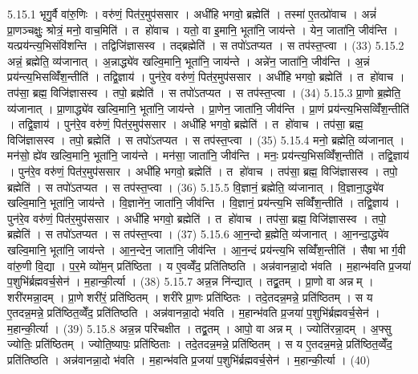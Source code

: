 5.15.1
भृगु॒र्वै वा॑रु॒णिः । वरु॑णं॒ पित॑र॒मुप॑ससार । अधी॑हि भगवो॒ ब्रह्मेति॑ । तस्मा॑ ए॒तत्प्रो॑वाच । अन्नं॑ प्रा॒णञ्चक्षुः॒ श्रोत्रं॒ मनो॒ वाच॒मिति॑ । त हो॑वाच । यतो॒ वा इ॒मानि॒ भूता॑नि॒ जाय॑न्ते । येन॒ जाता॑नि॒ जीव॑न्ति । यत्प्रय॑न्त्य॒भिसंवि॑शन्ति । तद्विजि॑ज्ञासस्व । तद्ब्रह्मेति॑ । स तपो॑ऽतप्यत । स तप॑स्त॒प्त्वा । (33)
5.15.2
अन्नं॒ ब्रह्मेति॒ व्य॑जानात् । अ॒न्नाद्ध्ये॑व खल्वि॒मानि॒ भूता॑नि॒ जाय॑न्ते । अन्ने॑न॒ जाता॑नि॒ जीव॑न्ति । अ॒न्नं प्रय॑न्त्य॒भिसव्विँ॑श॒न्तीति॑ । तद्वि॒ज्ञाय॑ । पुन॑रे॒व वरु॑णं॒ पित॑र॒मुप॑ससार । अधी॑हि भगवो॒ ब्रह्मेति॑ । त हो॑वाच । तप॑सा॒ ब्रह्म॒ विजि॑ज्ञासस्व । तपो॒ ब्रह्मेति॑ । स तपो॑ऽतप्यत । स तप॑स्त॒प्त्वा । (34)
5.15.3
प्रा॒णो ब्र॒ह्मेति॒ व्य॑जानात् । प्रा॒णाद्ध्ये॑व खल्वि॒मानि॒ भूता॑नि॒ जाय॑न्ते । प्रा॒णेन॒ जाता॑नि॒ जीव॑न्ति । प्रा॒णं प्रय॑न्त्य॒भिसव्विँ॑श॒न्तीति॑ । तद्वि॒ज्ञाय॑ । पुन॑रे॒व वरु॑णं॒ पित॑र॒मुप॑ससार । अधी॑हि भगवो॒ ब्रह्मेति॑ । त हो॑वाच । तप॑सा॒ ब्रह्म॒ विजि॑ज्ञासस्व । तपो॒ ब्रह्मेति॑ । स तपो॑ऽतप्यत । स तप॑स्त॒प्त्वा । (35)
5.15.4
मनो॒ ब्रह्मेति॒ व्य॑जानात् । मन॑सो॒ ह्ये॑व खल्वि॒मानि॒ भूता॑नि॒ जाय॑न्ते । मन॑सा॒ जाता॑नि॒ जीव॑न्ति । मनः॒ प्रय॑न्त्य॒भिसव्विँ॑श॒न्तीति॑ । तद्वि॒ज्ञाय॑ । पुन॑रे॒व वरु॑णं॒ पित॑र॒मुप॑ससार । अधी॑हि भगवो॒ ब्रह्मेति॑ । त हो॑वाच । तप॑सा॒ ब्रह्म॒ विजि॑ज्ञासस्व । तपो॒ ब्रह्मेति॑ । स तपो॑ऽतप्यत । स तप॑स्त॒प्त्वा । (36)
5.15.5
वि॒ज्ञानं॒ ब्रह्मेति॒ व्य॑जानात् । वि॒ज्ञाना॒द्ध्ये॑व खल्वि॒मानि॒ भूता॑नि॒ जाय॑न्ते । वि॒ज्ञाने॑न॒ जाता॑नि॒ जीव॑न्ति । वि॒ज्ञानं॒ प्रय॑न्त्य॒भि सव्विँ॑श॒न्तीति॑ । तद्वि॒ज्ञाय॑ । पुन॑रे॒व वरु॑णं॒ पित॑र॒मुप॑ससार । अधी॑हि भगवो॒ ब्रह्मेति॑ । त हो॑वाच । तप॑सा॒ ब्रह्म॒ विजि॑ज्ञासस्व । तपो॒ ब्रह्मेति॑ । स तपो॑ऽतप्यत । स तप॑स्त॒प्त्वा । (37)
5.15.6
आ॒न॒न्दो ब्र॒ह्मेति॒ व्य॑जानात् । आ॒नन्दा॒द्ध्ये॑व खल्वि॒मानि॒ भूता॑नि॒ जाय॑न्ते । आ॒न॒न्देन॒ जाता॑नि॒ जीव॑न्ति । आ॒न॒न्दं प्रय॑न्त्य॒भि सव्विँ॑श॒न्तीति॑ । सैषा भार्ग॒वी वा॑रु॒णी वि॒द्या । प॒र॒मे व्यो॑म॒न् प्रति॑ष्ठिता । य ए॒वव्वेँद॒ प्रति॑तिष्ठति । अन्न॑वानन्ना॒दो भ॑वति । म॒हान्भ॑वति प्र॒जया॑ प॒शुभि॑र्ब्रह्मवर्च॒सेन॑ । म॒हान्की॒र्त्या । (38)
5.15.7
अन्न॒न्न नि॑न्द्यात् । तद्व्र॒तम् । प्रा॒णो वा अन्नम् । शरी॑रमन्ना॒दम् । प्रा॒णे शरी॑रं॒ प्रति॑ष्ठितम् । शरी॑रे प्रा॒णः प्रति॑ष्ठितः । तदे॒तदन्न॒मन्ने॒ प्रति॑ष्ठितम् । स य ए॒तदन्न॒मन्ने॒ प्रति॑ष्ठित॒व्वेँद॒ प्रति॑तिष्ठति । अन्न॑वानन्ना॒दो भ॑वति । म॒हान्भ॑वति प्र॒जया॑ प॒शुभि॑र्ब्रह्मवर्च॒सेन॑ । म॒हान्की॒र्त्या । (39)
5.15.8
अन्न॒न्न परि॑चक्षीत । तद्व्र॒तम् । आपो॒ वा अन्नम् । ज्योति॑रन्ना॒दम् । अ॒फ्सु ज्योतिः॒ प्रति॑ष्ठितम् । ज्योति॒ष्यापः॒ प्रति॑ष्ठिताः । तदे॒तदन्न॒मन्ने॒ प्रति॑ष्ठितम् । स य ए॒तदन्न॒मन्ने॒ प्रति॑ष्ठित॒व्वेँद॒ प्रति॑तिष्ठति । अन्न॑वानन्ना॒दो भ॑वति । म॒हान्भ॑वति प्र॒जया॑ प॒शुभि॑र्ब्रह्मवर्च॒सेन॑ । म॒हान्की॒र्त्या । (40)

